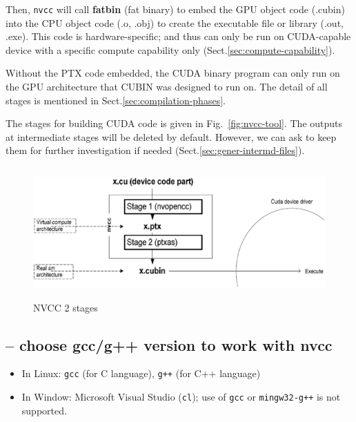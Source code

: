 \begin{enumerate}
\begin{enumerate}
  
  Then, \verb!nvcc! will call {\bf fatbin} (fat binary) to embed the GPU object
  code (.cubin) into the CPU object code (.o, .obj) to create the executable
  file or  library (.out, .exe). This code is hardware-specific; and thus can
  only be run on CUDA-capable device with a specific compute capability only
  (Sect.\ref{sec:compute-capability}).
 
Without the PTX code embedded, the CUDA binary program can only run on the GPU
architecture that CUBIN was designed to run on. The detail of all stages is
mentioned in Sect.\ref{sec:compilation-phases}.
  
\end{enumerate}

The stages for building CUDA code is given in Fig.~\ref{fig:nvcc-tool}. The
outputs at intermediate stages will be deleted by default. However, we can ask
to keep them for further investigation if needed
(Sect.\ref{sec:gener-intermd-files}).


\end{enumerate}



\begin{figure}[hbt]
  \centerline{\includegraphics[height=5cm,
    angle=0]{./images/nvcc_compile.eps}}
\caption{NVCC 2 stages}
\label{fig:nvcc_stg}
\end{figure}


\subsection{-- choose gcc/g++ version to work with nvcc}
\label{sec:nvcc-gcc}
\label{sec:host-code-compiler}
 
 
\begin{itemize}
\item In Linux: \verb!gcc! (for C language), \verb!g++! (for C++ language)
\item In Window: Microsoft Visual Studio (\verb!cl!); use of
  \verb!gcc! or \verb!mingw32-g++! is not supported.
\end{itemize}

